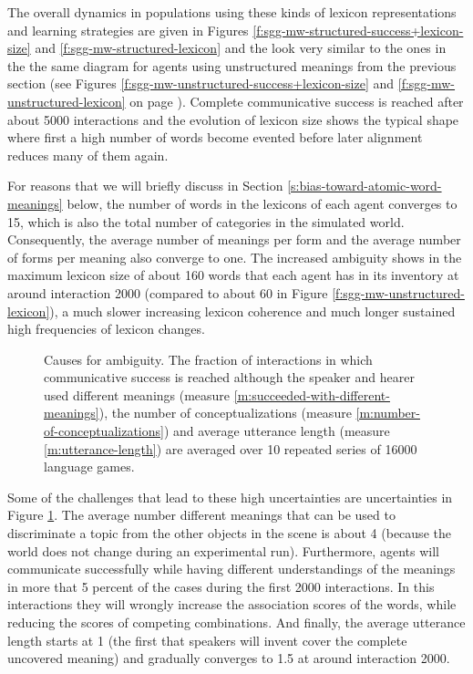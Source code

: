 \stopfiguregroup

The overall dynamics in populations using these kinds of lexicon
representations and learning strategies are given in Figures
\ref{f:sgg-mw-structured-success+lexicon-size} and
\ref{f:sgg-mw-structured-lexicon} and the look very similar to the
ones in the the same diagram for agents using unstructured meanings
from the previous section (see Figures
\ref{f:sgg-mw-unstructured-success+lexicon-size} and
\ref{f:sgg-mw-unstructured-lexicon} on page
\pageref{f:sgg-mw-unstructured-success+lexicon-size}). Complete
communicative success is reached after about 5000 interactions and the
evolution of lexicon size shows the typical shape where first a high
number of words become evented before later alignment reduces many of
them again. 

For reasons that we will briefly discuss in Section
\ref{s:bias-toward-atomic-word-meanings} below, the number of words in
the lexicons of each agent converges to 15, which is also the total
number of categories in the simulated world. Consequently, the average
number of meanings per form and the average number of forms per
meaning also converge to one. The increased ambiguity shows in the
maximum lexicon size of about 160 words that each agent has in its
inventory at around interaction 2000 (compared to about 60 in Figure
\ref{f:sgg-mw-unstructured-lexicon}), a much slower increasing
lexicon coherence and much longer sustained high frequencies of
lexicon changes.


\begin{figure}[t]
  \caption{Causes for ambiguity. The fraction of interactions in which
    communicative success is reached although the speaker and hearer
    used different meanings (measure
    \ref{m:succeeded-with-different-meanings}), the number of
    conceptualizations (measure \ref{m:number-of-conceptualizations})
    and average utterance length (measure \ref{m:utterance-length})
    are averaged over 10 repeated series of 16000 language games.}
  \label{f:sgg-mw-structured-misunderstandings+conceptualizations+utterance-length}
\end{figure}

Some of the challenges that lead to these high uncertainties are
uncertainties in Figure
\ref{f:sgg-mw-structured-misunderstandings+conceptualizations+utterance-length}. The
average number different meanings that can be used to discriminate a
topic from the other objects in the scene is about 4 (because the
world does not change during an experimental run). Furthermore, agents
will communicate successfully while having different understandings of
the meanings in more that 5 percent of the cases during the first 2000
interactions. In this interactions they will wrongly increase the
association scores of the words, while reducing the scores of
competing combinations. And finally, the average utterance length
starts at 1 (the first that speakers will invent cover the complete
uncovered meaning) and gradually converges to 1.5 at around
interaction 2000.


